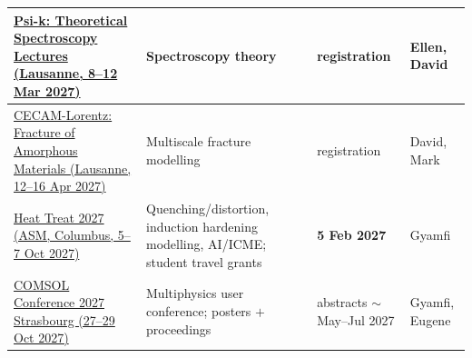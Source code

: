 \documentclass[11pt,a4paper]{article}
\begin{document}
\begin{longtable}{@{}p{3.4cm}p{5.6cm}p{2.2cm}p{2.7cm}@{}}
\midrule
\href{https://psi-k.net/workshops/}{Psi-k: Theoretical Spectroscopy Lectures (Lausanne, 8--12 Mar 2027)} & Spectroscopy theory & registration & Ellen, David \\
\midrule
\href{https://www.lorentzcenter.nl/the-outcome-of-the-2027-cecam-lorentz-call-is-here.html}{CECAM-Lorentz: Fracture of Amorphous Materials (Lausanne, 12--16 Apr 2027)} & Multiscale fracture modelling & registration & David, Mark \\
\midrule
\href{https://www.asminternational.org/heat-treat-event/cfp}{Heat Treat 2027 (ASM, Columbus, 5--7 Oct 2027)} & Quenching/distortion, induction hardening modelling, AI/ICME; student travel grants & \textbf{5 Feb 2027} & Gyamfi \\
\midrule
\href{https://www.comsol.com/events/special/comsol-conference-2027-strasbourg-139292}{COMSOL Conference 2027 Strasbourg (27--29 Oct 2027)} & Multiphysics user conference; posters $+$ proceedings & abstracts $\sim$May--Jul 2027 & Gyamfi, Eugene \\
\midrule


\end{longtable}
\end{document}
